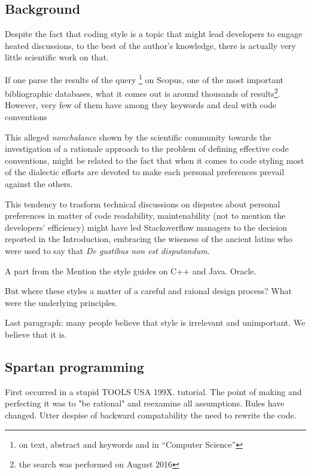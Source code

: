 \subsection{Background}

Despite the fact that coding style is a topic that might lead developers to engage heated 
discussions, to the best of the author's knowledge, there is actually very little scientific 
work on that. 

If one parse the results of the query 
\footnote{on text, abstract and keywords and in ``Computer Science''} 
on Scopus, one of the most important bibliographic databases, what it comes out is around 
thousands of results\footnote{the search was performed on August 2016}. 
However, very few of them  have  among they
keywords and deal with code conventions

This alleged \emph{nonchalance} shown by the scientific community towards the investigation 
of a rationale approach to the problem of defining effective code conventions, might be 
related to the fact that when it comes to code styling most of the dialectic efforts are devoted
to make each personal preferences prevail against the others.

This tendency to trasform technical discussions on disputes about personal preferences 
in matter of code readability, maintenability (not to mention the developers' efficiency) might 
have led Stackoverflow managers to the decision reported in the Introduction, embracing the 
wiseness of the ancient latins who were used to say that \emph{De gustibus non est disputandum}.


A part from the Mention the style guides on C++ and Java. Oracle.

But where these styles a matter of a careful and raional design process?
What were the underlying principles.

Last paragraph: many people believe that style is irrelevant and unimportant.
We believe that it is.

\subsection{Spartan programming}
First occurred in a stupid TOOLS USA 199X. tutorial.
The point of making and perfecting it was to "be rational" and
reexamine all assumptions.
Rules have changed.
Utter despise of backward compatability the need to rewrite the code.

